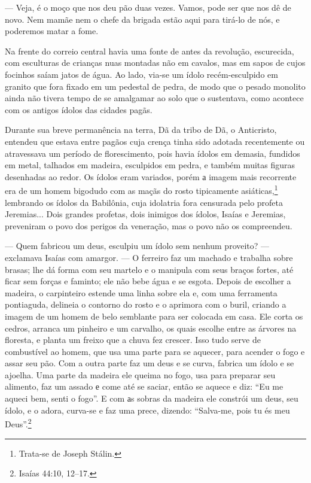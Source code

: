 --- Veja, é o moço que nos deu pão duas vezes. Vamos, pode ser que nos
dê de novo. Nem mamãe nem o chefe da brigada estão aqui para tirá-lo de
nós, e poderemos matar a fome.

Na frente do correio central havia uma fonte de antes da revolução,
escurecida, com esculturas de crianças nuas montadas não em cavalos, mas
em sapos de cujos focinhos saíam jatos de água. Ao lado, via-se um ídolo
recém-esculpido em granito que fora fixado em um pedestal de pedra, de
modo que o pesado monolito ainda não tivera tempo de se amalgamar ao
solo que o sustentava, como acontece com os antigos ídolos das cidades
pagãs.

Durante sua breve permanência na terra, Dã da tribo de Dã, o Anticristo,
entendeu que estava entre pagãos cuja crença tinha sido adotada
recentemente ou atravessava um período de florescimento, pois havia
ídolos em demasia, fundidos em metal, talhados em madeira, esculpidos em
pedra, e também muitas figuras desenhadas ao redor. Os ídolos eram
variados, porém а imagem mais recorrente era de um homem bigodudo com as
maçãs do rosto tipicamente asiáticas,\footnote{Trata-se de Joseph
  Stálin.} lembrando os ídolos da Babilônia, cuja idolatria fora
censurada pelo profeta Jeremias... Dois grandes profetas, dois inimigos
dos ídolos, Isaías e Jeremias, preveniram o povo dos perigos da
veneração, mas o povo não os compreendeu.

--- Quem fabricou um deus, esculpiu um ídolo sem nenhum proveito? ---
exclamava Isaías com amargor. --- O ferreiro faz um machado e trabalha
sobre brasas; lhe dá forma com seu martelo e o manipula com seus braços
fortes, até ficar sem forças e faminto; ele não bebe água e se esgota.
Depois de escolher a madeira, o carpinteiro estende uma linha sobre ela
e, com uma ferramenta pontiaguda, delineia o contorno do rosto e o
aprimora com o buril, criando a imagem de um homem de belo semblante
para ser colocada em casa. Ele corta os cedros, arranca um pinheiro e um
carvalho, os quais escolhe entre as árvores na floresta, e planta um
freixo que a chuva fez crescer. Isso tudo serve de combustível ao homem,
que usa uma parte para se aquecer, para acender o fogo e assar seu pão.
Com a outra parte faz um deus e se curva, fabrica um ídolo e se ajoelha.
Uma parte da madeira ele queima no fogo, usa para preparar seu alimento,
faz um assado е come até se saciar, então se aquece e diz: ``Eu me
aqueci bem, senti o fogo''. E com аs sobras da madeira ele constrói um
deus, seu ídolo, e o adora, curva-se e faz uma prece, dizendo:
``Salva-me, pois tu és meu Deus''.\footnote{Isaías 44:10, 12--17.}


